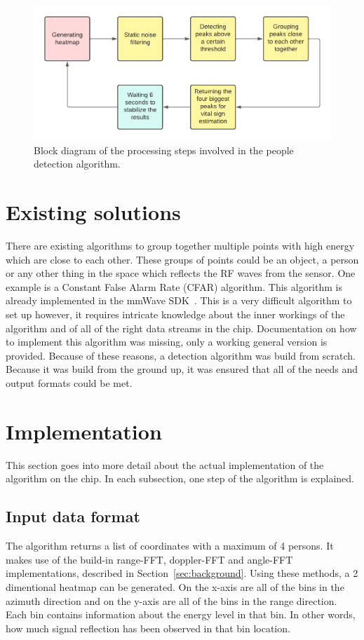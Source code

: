 \begin{figure}[t]
\centering
\includegraphics[width=.9\textwidth]{figures/people_detection/People detection algorithm.pdf}
\caption{Block diagram of the processing steps involved in the people detection algorithm.}
\label{fig:people_detection_block_diagram}
\end{figure}

\section{Existing solutions}
There are existing algorithms to group together multiple points with high energy which are close to each other. These groups of points could be an object, a person or any other thing in the space which reflects the RF waves from the sensor. One example is a Constant False Alarm Rate (CFAR) algorithm. This algorithm is already implemented in the mmWave SDK~\cite{mmwavesdk_website}. This is a very difficult algorithm to set up however, it requires intricate knowledge about the inner workings of the algorithm and of all of the right data streams in the chip. Documentation on how to implement this algorithm was missing, only a working general version is provided. Because of these reasons, a detection algorithm was build from scratch. Because it was build from the ground up, it was ensured that all of the needs and output formats could be met.

\section{Implementation}
\label{sec:people_detection_implementation}
This section goes into more detail about the actual implementation of the algorithm on the chip. In each subsection, one step of the algorithm is explained.

\subsection{Input data format}
The algorithm returns a list of coordinates with a maximum of 4 persons. It makes use of the build-in range-FFT, doppler-FFT and angle-FFT implementations, described in Section~\ref{sec:background}. Using these methods, a 2 dimentional heatmap can be generated. On the x-axis are all of the bins in the azimuth direction and on the y-axis are all of the bins in the range direction. Each bin contains information about the energy level in that bin. In other words, how much signal reflection has been observed in that bin location. 

